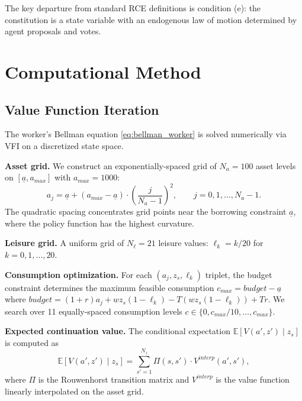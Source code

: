 \documentclass[12pt]{article}
\newcommand{\E}{\mathbb{E}}
\begin{document}
The key departure from standard RCE definitions is condition (e): the constitution is a state variable with an endogenous law of motion determined by agent proposals and votes.


\section{Computational Method}\label{sec:computation}

\subsection{Value Function Iteration}\label{sec:vfi}

The worker's Bellman equation \eqref{eq:bellman_worker} is solved numerically via VFI on a discretized state space.

\textbf{Asset grid.} We construct an exponentially-spaced grid of $N_a = 100$ asset levels on $[\underline{a}, a_{max}]$ with $a_{max} = 1000$:
\begin{equation}\label{eq:asset_grid}
  a_j = \underline{a} + (a_{max} - \underline{a}) \cdot \left(\frac{j}{N_a - 1}\right)^2, \qquad j = 0, 1, \ldots, N_a - 1.
\end{equation}
The quadratic spacing concentrates grid points near the borrowing constraint $\underline{a}$, where the policy function has the highest curvature.

\textbf{Leisure grid.} A uniform grid of $N_\ell = 21$ leisure values: $\ell_k = k/20$ for $k = 0, 1, \ldots, 20$.

\textbf{Consumption optimization.} For each $(a_j, z_s, \ell_k)$ triplet, the budget constraint determines the maximum feasible consumption $c_{max} = budget - \underline{a}$ where $budget = (1+r)a_j + wz_s(1-\ell_k) - T(wz_s(1-\ell_k)) + Tr$. We search over 11 equally-spaced consumption levels $c \in \{0, c_{max}/10, \ldots, c_{max}\}$.

\textbf{Expected continuation value.} The conditional expectation $\E[V(a', z') \mid z_s]$ is computed as
\begin{equation}\label{eq:ev}
  \E[V(a', z') \mid z_s] = \sum_{s'=1}^{N_z} \Pi(s, s') \cdot V^{interp}(a', s'),
\end{equation}
where $\Pi$ is the Rouwenhorst transition matrix and $V^{interp}$ is the value function linearly interpolated on the asset grid.
\end{document}
